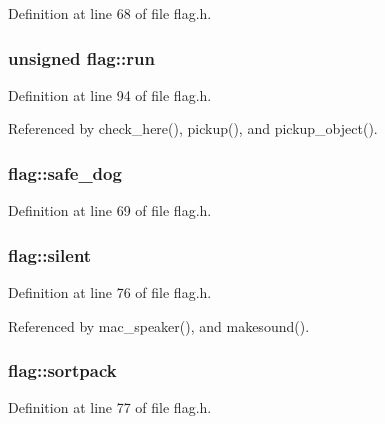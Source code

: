 Definition at line 68 of file flag.\+h.

\hypertarget{structflag_a75d9c7e384cce1696f2c2d1b2881d162}{
\subsubsection[{run}]{\setlength{\rightskip}{0pt plus 5cm}unsigned flag\+::run}}\label{structflag_a75d9c7e384cce1696f2c2d1b2881d162}


Definition at line 94 of file flag.\+h.



Referenced by check\+\_\+here(), pickup(), and pickup\+\_\+object().

\hypertarget{structflag_a86aaf588ab0112761cc48687e7052142}{
\subsubsection[{safe\+\_\+dog}]{ flag\+::safe\+\_\+dog}}\label{structflag_a86aaf588ab0112761cc48687e7052142}


Definition at line 69 of file flag.\+h.

\hypertarget{structflag_a12a28da243338f8c34e9c1d51a5a58bf}{
\subsubsection[{silent}]{ flag\+::silent}}\label{structflag_a12a28da243338f8c34e9c1d51a5a58bf}


Definition at line 76 of file flag.\+h.



Referenced by mac\+\_\+speaker(), and makesound().

\hypertarget{structflag_afff9be3ac6437f0eb678cc3644c04fac}{
\subsubsection[{sortpack}]{ flag\+::sortpack}}\label{structflag_afff9be3ac6437f0eb678cc3644c04fac}


Definition at line 77 of file flag.\+h.

